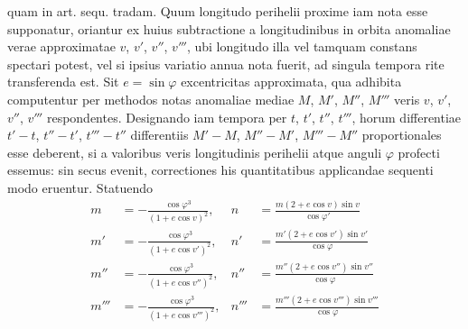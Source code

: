 quam in art. sequ. tradam.
Quum longitudo perihelii proxime iam nota esse supponatur, oriantur ex huius subtractione a longitudinibus in orbita anomaliae verae approximatae $v$, $v'$, $v''$, $v'''$, ubi longitudo illa vel tamquam constans spectari potest, vel si ipsius variatio annua nota fuerit, ad singula tempora rite transferenda est. Sit $e=\sin\varphi$ excentricitas approximata, qua adhibita computentur per methodos notas anomaliae mediae $M$, $M'$, $M''$, $M'''$ veris $v$, $v'$, $v''$, $v'''$ respondentes. Designando iam tempora per $t$, $t'$, $t''$, $t'''$, horum differentiae $t'-t$, $t''-t'$, $t'''-t''$ differentiis $M'-M$, $M''-M'$, $M'''-M''$ proportionales esse deberent, si a valoribus veris longitudinis perihelii atque anguli $\varphi$ profecti essemus: sin secus evenit, correctiones his quantitatibus applicandae sequenti modo eruentur. Statuendo
\[
\begin{aligned}
m&=-\frac{\cos\varphi^3}{(1+e\cos v)^2},&n&=\frac{m(2+e\cos v)\sin v}{\cos\varphi'}\\[6pt]
m'&=-\frac{\cos\varphi^3}{(1+e\cos v')^2},&n'&=\frac{m'(2+e\cos v')\sin v'}{\cos\varphi}\\[6pt]
m''&=-\frac{\cos\varphi^3}{(1+e\cos v'')^2},&n''&=\frac{m''(2+e\cos v'')\sin v''}{\cos\varphi}\\[6pt]
m'''&=-\frac{\cos\varphi^3}{(1+e\cos v''')^2},&n'''&=\frac{m'''(2+e\cos v''')\sin v'''}{\cos\varphi}
\end{aligned}
\]
\clearpage
\endgroup
